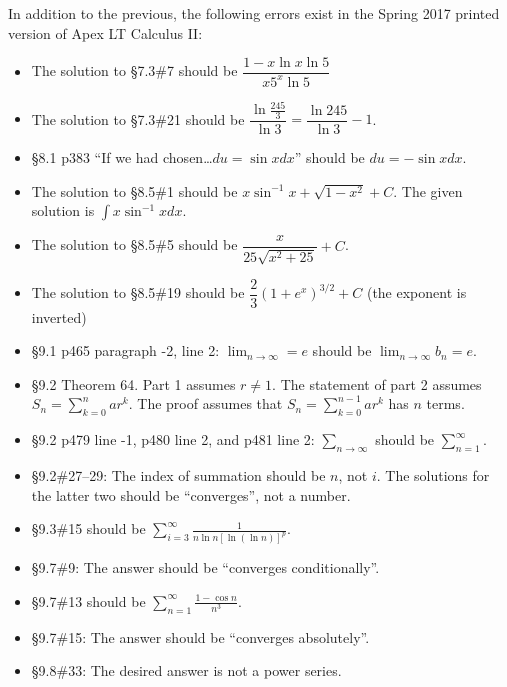\documentclass{amsart}
\newcommand{\ds}{\displaystyle}
\begin{document}
\clearpage

\springerrors

In addition to the previous, the following errors exist in the Spring 2017 printed version of Apex LT Calculus II:
\begin{itemize}
\item The solution to \S7.3\#7 should be $\dfrac{1-x\ln x\ln5}{x5^x\ln5}$\smallskip
\item The solution to \S7.3\#21 should be $\dfrac{\ln\frac{245}3}{\ln3}=\dfrac{\ln245}{\ln3}-1$.
\item \S8.1 p383 ``If we had chosen\ldots $du=\sin x dx$'' should be $du=-\sin x dx$.
\item The solution to \S8.5\#1 should be $x\sin^{-1}x+\sqrt{1-x^2}+C$.  The given solution is $\ds\int x\sin^{-1}x dx$.\vspace{-.3\baselineskip}
\item The solution to \S8.5\#5 should be $\dfrac x{25\sqrt{x^2+25}}+C$.
\item The solution to \S8.5\#19 should be $\dfrac23 (1+e^x)^{3/2}+C$ (the exponent is inverted)
\item \S9.1 p465 paragraph -2, line 2: $\ds \lim_{n\to \infty}=e$ should be $\ds \lim_{n\to \infty}b_n=e$.
\vspace{-.5\baselineskip}
\item \S9.2 Theorem 64.  Part 1 assumes $r\neq1$.  The statement of part 2 assumes $S_n=\ds\sum_{k=0}^n ar^k$.\vspace{-\baselineskip} The proof assumes that $S_n=\ds\sum_{k=0}^{n-1} ar^k$ has $n$ terms.\vspace{-.7\baselineskip}
\item \S9.2 p479 line -1, p480 line 2, and p481 line 2: $\ds\sum_{n\to\infty}$ should be $\ds\sum_{n=1}^\infty$.
\item \S9.2\#27--29: The index of summation should be $n$, not $i$.  The solutions for the latter two should be ``converges'', not a number.\vspace{-.3\baselineskip}
\item \S9.3\#15 should be $\ds\sum_{i=3}^\infty\frac1{n\ln n[\ln(\ln n)]^p}$.
\item \S9.7\#9: The answer should be ``converges conditionally''.
\item \S9.7\#13 should be $\ds \sum_{n=1}^\infty \frac{1-\cos n}{n^3}$.
\item \S9.7\#15: The answer should be ``converges absolutely''.
\item \S9.8\#33: The desired answer is not a power series.

\end{itemize}
\end{document}
